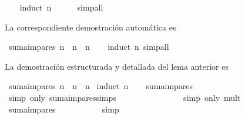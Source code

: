\begin{isabellebody}
%
\isadelimproof
\ \ %
\endisadelimproof
%
\isatagproof
{}\isamarkupfalse%
\ {\isacharparenleft}induct\ n{\isacharparenright}\ \isanewline
\ \ \ \isamarkupfalse%
\ simp{\isacharunderscore}all\isanewline
\ \ \isamarkupfalse%
%
\endisatagproof
{\isafoldproof}%
%
\isadelimproof
%
\endisadelimproof
%
\begin{isamarkuptext}%
La correspondiente demostración automática es%
\end{isamarkuptext}\isamarkuptrue%
\isamarkupfalse%
\ {\isachardoublequoteopen}suma{\isacharunderscore}impares\ n\ {\isacharequal}\ n\ {\isacharasterisk}\ n{\isachardoublequoteclose}\isanewline
%
\isadelimproof
\ \ %
\endisadelimproof
%
\isatagproof
{}\isamarkupfalse%
\ {\isacharparenleft}induct\ n{\isacharparenright}\ simp{\isacharunderscore}all%
\endisatagproof
{\isafoldproof}%
%
\isadelimproof
%
\endisadelimproof
%
\begin{isamarkuptext}%
La demostración estructurada y detallada del lema anterior es%
\end{isamarkuptext}\isamarkuptrue%
\isamarkupfalse%
\ {\isachardoublequoteopen}suma{\isacharunderscore}impares\ n\ {\isacharequal}\ n\ {\isacharasterisk}\ n{\isachardoublequoteclose}\isanewline
%
\isadelimproof
%
\endisadelimproof
%
\isatagproof
{}\isamarkupfalse%
\ {\isacharparenleft}induct\ n{\isacharparenright}\isanewline
\ \ \isamarkupfalse%
\ {\isachardoublequoteopen}suma{\isacharunderscore}impares\ {}\ {\isacharequal}\ {}{\isachardoublequoteclose}\ \isanewline
\ \ \ \ \isamarkupfalse%
\ {\isacharparenleft}simp\ only{\isacharcolon}\ suma{\isacharunderscore}impares{\isachardot}simps{\isacharparenleft}{}{\isacharparenright}{\isacharparenright}\isanewline
\ \ \isamarkupfalse%
\ \isamarkupfalse%
\ {\isachardoublequoteopen}{\isasymdots}\ {\isacharequal}\ {}\ {\isacharasterisk}\ {}{\isachardoublequoteclose}\isanewline
\ \ \ \ \isamarkupfalse%
\ {\isacharparenleft}simp\ only{\isacharcolon}\ mult{\isacharunderscore}{}{\isacharparenright}\isanewline
\ \ \isamarkupfalse%
\ \isamarkupfalse%
\ {\isachardoublequoteopen}suma{\isacharunderscore}impares\ {}\ {\isacharequal}\ {}\ {\isacharasterisk}\ {}{\isachardoublequoteclose}\isanewline
\ \ \ \ \isamarkupfalse%
\ simp\isanewline
{}\isamarkupfalse%

\end{isabellebody}
